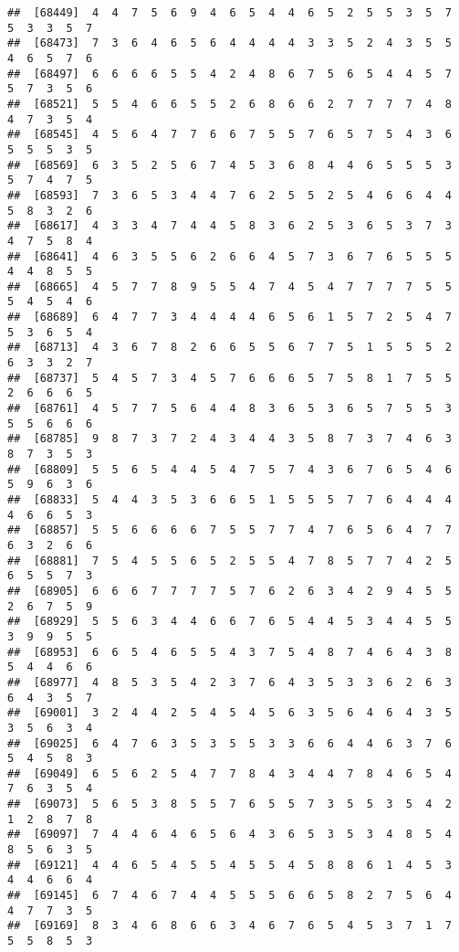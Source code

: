 \documentclass[
]{book}
\begin{document}
\begin{verbatim}
##  [68449]  4  4  7  5  6  9  4  6  5  4  4  6  5  2  5  5  3  5  7  5  3  3  5  7
##  [68473]  7  3  6  4  6  5  6  4  4  4  4  3  3  5  2  4  3  5  5  4  6  5  7  6
##  [68497]  6  6  6  6  5  5  4  2  4  8  6  7  5  6  5  4  4  5  7  5  7  3  5  6
##  [68521]  5  5  4  6  6  5  5  2  6  8  6  6  2  7  7  7  7  4  8  4  7  3  5  4
##  [68545]  4  5  6  4  7  7  6  6  7  5  5  7  6  5  7  5  4  3  6  5  5  5  3  5
##  [68569]  6  3  5  2  5  6  7  4  5  3  6  8  4  4  6  5  5  5  3  5  7  4  7  5
##  [68593]  7  3  6  5  3  4  4  7  6  2  5  5  2  5  4  6  6  4  4  5  8  3  2  6
##  [68617]  4  3  3  4  7  4  4  5  8  3  6  2  5  3  6  5  3  7  3  4  7  5  8  4
##  [68641]  4  6  3  5  5  6  2  6  6  4  5  7  3  6  7  6  5  5  5  4  4  8  5  5
##  [68665]  4  5  7  7  8  9  5  5  4  7  4  5  4  7  7  7  7  5  5  5  4  5  4  6
##  [68689]  6  4  7  7  3  4  4  4  4  6  5  6  1  5  7  2  5  4  7  5  3  6  5  4
##  [68713]  4  3  6  7  8  2  6  6  5  5  6  7  7  5  1  5  5  5  2  6  3  3  2  7
##  [68737]  5  4  5  7  3  4  5  7  6  6  6  5  7  5  8  1  7  5  5  2  6  6  6  5
##  [68761]  4  5  7  7  5  6  4  4  8  3  6  5  3  6  5  7  5  5  3  5  5  6  6  6
##  [68785]  9  8  7  3  7  2  4  3  4  4  3  5  8  7  3  7  4  6  3  8  7  3  5  3
##  [68809]  5  5  6  5  4  4  5  4  7  5  7  4  3  6  7  6  5  4  6  5  9  6  3  6
##  [68833]  5  4  4  3  5  3  6  6  5  1  5  5  5  7  7  6  4  4  4  4  6  6  5  3
##  [68857]  5  5  6  6  6  6  7  5  5  7  7  4  7  6  5  6  4  7  7  6  3  2  6  6
##  [68881]  7  5  4  5  5  6  5  2  5  5  4  7  8  5  7  7  4  2  5  6  5  5  7  3
##  [68905]  6  6  6  7  7  7  7  5  7  6  2  6  3  4  2  9  4  5  5  2  6  7  5  9
##  [68929]  5  5  6  3  4  4  6  6  7  6  5  4  4  5  3  4  4  5  5  3  9  9  5  5
##  [68953]  6  6  5  4  6  5  5  4  3  7  5  4  8  7  4  6  4  3  8  5  4  4  6  6
##  [68977]  4  8  5  3  5  4  2  3  7  6  4  3  5  3  3  6  2  6  3  6  4  3  5  7
##  [69001]  3  2  4  4  2  5  4  5  4  5  6  3  5  6  4  6  4  3  5  3  5  6  3  4
##  [69025]  6  4  7  6  3  5  3  5  5  3  3  6  6  4  4  6  3  7  6  5  4  5  8  3
##  [69049]  6  5  6  2  5  4  7  7  8  4  3  4  4  7  8  4  6  5  4  7  6  3  5  4
##  [69073]  5  6  5  3  8  5  5  7  6  5  5  7  3  5  5  3  5  4  2  1  2  8  7  8
##  [69097]  7  4  4  6  4  6  5  6  4  3  6  5  3  5  3  4  8  5  4  8  5  6  3  5
##  [69121]  4  4  6  5  4  5  5  4  5  5  4  5  8  8  6  1  4  5  3  4  4  6  6  4
##  [69145]  6  7  4  6  7  4  4  5  5  5  6  6  5  8  2  7  5  6  4  4  7  7  3  5
##  [69169]  8  3  4  6  8  6  6  3  4  6  7  6  5  4  5  3  7  1  7  5  5  8  5  3

\end{verbatim}
\end{document}
